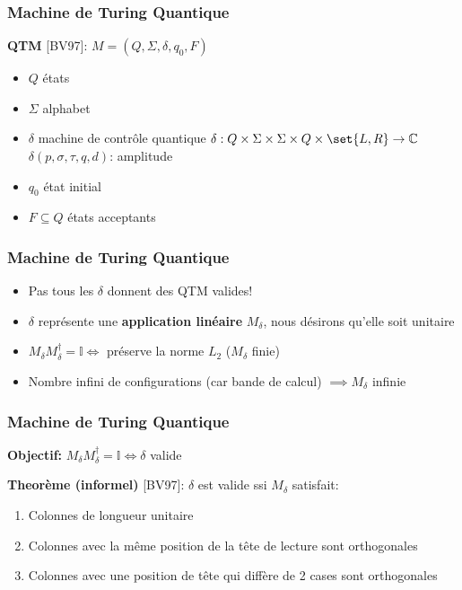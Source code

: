 \documentclass{beamer}
\begin{document}
\begin{frame}
  \frametitle{Machine de Turing Quantique}

  \textbf{QTM} [BV97]: $M = (Q, \Sigma, \delta, q_0, F)$
  \begin{itemize}
    \item $Q$ \'etats
    \item $\Sigma$ alphabet
    \item $\delta$ machine de contr\^ole quantique $\delta: Q \times \Sigma \times \Sigma \times Q \times \set{L, R} \rightarrow \mathbb{C}$\\
          $\delta(p,\sigma,\tau,q,d)$: amplitude
    \item $q_0$ \'etat initial
    \item $F \subseteq Q$ \'etats acceptants
  \end{itemize}
\end{frame}

\begin{frame}
  \frametitle{Machine de Turing Quantique}

  \begin{itemize}
    \item Pas tous les $\delta$ donnent des QTM valides! \pause
    \item $\delta$ repr\'esente une \textbf{application lin\'eaire} $M_\delta$, nous d\'esirons qu'elle soit \alert{unitaire} \pause
    \item $M_\delta M_\delta^\dag = \mathbb{I} \iff$ pr\'eserve la norme $L_2$ ($M_\delta$ finie) \pause
    \item Nombre \alert{infini} de configurations (car bande de calcul) $\implies M_\delta$ infinie
  \end{itemize}
\end{frame}

\begin{frame}
  \frametitle{Machine de Turing Quantique}

  \textbf{Objectif:} $M_\delta M_\delta^\dag = \mathbb{I} \iff \delta$ valide

  \textbf{Theor\`eme (informel)} [BV97]: $\delta$ est valide ssi $M_\delta$ satisfait:
  \begin{enumerate}
    \item Colonnes de longueur unitaire
    \item Colonnes avec la m\^eme position de la t\^ete de lecture sont orthogonales
    \item Colonnes avec une position de t\^ete qui diff\`ere de 2 cases sont orthogonales
  \end{enumerate}
\end{frame}
\end{document}
